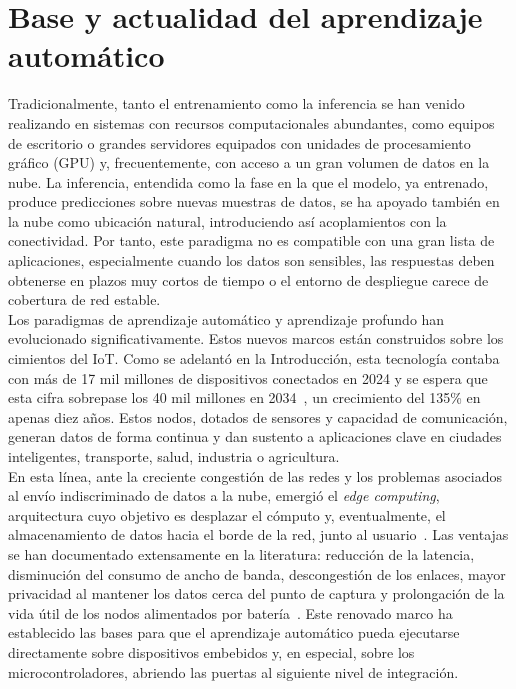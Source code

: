 \documentclass[a4paper,12pt,twoside,final]{book}
\begin{document}
\section{Base y actualidad del aprendizaje automático}
Tradicionalmente, tanto el entrenamiento como la inferencia se han venido realizando en sistemas con recursos
computacionales abundantes, como equipos de escritorio o grandes servidores equipados con unidades de
procesamiento gráfico (GPU) y, frecuentemente, con acceso a un gran volumen de datos en la nube. La
inferencia, entendida como la fase en la que el modelo, ya entrenado, produce predicciones sobre nuevas muestras
de datos, se ha apoyado también en la nube como ubicación natural, introduciendo así acoplamientos con la
conectividad. Por tanto, este paradigma no es compatible con una gran lista de aplicaciones, especialmente cuando
los datos son sensibles, las respuestas deben obtenerse en plazos muy cortos de tiempo o el entorno de despliegue
carece de cobertura de red estable.\\

Los paradigmas de aprendizaje automático y aprendizaje profundo han evolucionado significativamente. Estos nuevos
marcos están construidos sobre los cimientos del IoT. Como se adelantó en la Introducción, esta
tecnología contaba con más de 17 mil millones de dispositivos conectados en 2024 y se espera que esta cifra
sobrepase los 40 mil millones en 2034~\cite{taylor2026statista}, un crecimiento del 135\% en apenas diez años.
Estos nodos, dotados de sensores y capacidad de comunicación, generan datos de forma continua y dan sustento a
aplicaciones clave en ciudades inteligentes, transporte, salud, industria o agricultura.\\

En esta línea, ante la creciente congestión de las redes y los problemas asociados al envío indiscriminado de
datos a la nube, emergió el \textit{edge computing}, arquitectura cuyo objetivo es desplazar el cómputo y,
eventualmente, el almacenamiento de datos hacia el borde de la red, junto al usuario~\cite{yu2022ieeeaccess}. Las
ventajas se han documentado extensamente en la literatura: reducción de la latencia, disminución del consumo de
ancho de banda, descongestión de los enlaces, mayor privacidad al mantener los datos cerca del punto de captura y
prolongación de la vida útil de los nodos alimentados por batería~\cite{yu2022ieeeaccess}. Este renovado marco ha
establecido las bases para que el aprendizaje automático pueda ejecutarse directamente sobre dispositivos
embebidos y, en especial, sobre los microcontroladores, abriendo las puertas al siguiente nivel de integración.
\end{document}
